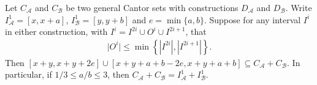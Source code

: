 \documentclass{ws-ijnt}
\begin{document}
	\begin{proposition}
		Let $C_{\mathcal{A}}$ and $C_{\mathcal{B}}$ be two general Cantor sets with constructions $D_{\mathcal{A}}$ and $D_{\mathcal{B}}$. Write $I_{\mathcal{A}}^1=[x,x+a]$,  $I_{\mathcal{B}}^1=[y,y+b]$ and $e=\min\{a,b\}$. Suppose for any interval $I^{i}$ in either construction, with $I^{i} = I^{2i}\cup O^{i} \cup I^{2i+1}$, that
		\begin{align*}
			\lvert O^{i}\rvert
			\leq \min{\left\{\left\lvert I^{2i}\right\rvert, \left\lvert I^{2i+1}\right\rvert\right\}}.
		\end{align*}
		Then $[x+y, x+y+2e]\cup[x+y+a+b-2e, x+y+a+b]\subseteq C_{\mathcal{A}}+C_{\mathcal{B}}$. In particular, if $1/3\leq a/b\leq 3$, then $C_{\mathcal{A}}+C_{\mathcal{B}} = I_{\mathcal{A}}^{1}+I_{\mathcal{B}}^1$.
	\end{proposition}
	
\end{document}
